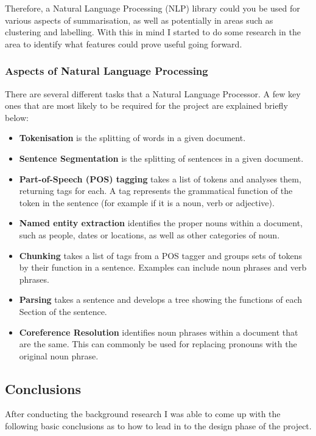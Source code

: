 \documentclass[12pt]{article}
\begin{document}
Therefore, a Natural Language Processing (NLP) library could you be used for various aspects of summarisation, as well as potentially in areas such as clustering and labelling. With this in mind I started to do some research in the area to identify what features could prove useful going forward.

\subsubsection{Aspects of Natural Language Processing} 

\label{nlptypes}

There are several different tasks that a Natural Language Processor. A few key ones that are most likely to be required for the project are explained briefly below: 

\begin{itemize}
	\item \textbf{Tokenisation} is the splitting of words in a given document. 
	\item \textbf{Sentence Segmentation} is the splitting of sentences in a given document. 
	\item \textbf{Part-of-Speech (POS) tagging} takes a list of tokens and analyses them, returning tags for each. A tag represents the grammatical function of the token in the sentence (for example if it is a noun, verb or adjective). 
	\item \textbf{Named entity extraction} identifies the proper nouns within a document, such as people, dates or locations, as well as other categories of noun. 
	\item \textbf{Chunking} takes a list of tags from a POS tagger and groups sets of tokens by their function in a sentence. Examples can include noun phrases and verb phrases. 
	\item \textbf{Parsing} takes a sentence and develops a tree showing the functions of each Section of the sentence. 
	\item \textbf{Coreference Resolution} identifies noun phrases within a document that are the same. This can commonly be used for replacing pronouns with the original noun phrase. 
\end{itemize}

\subsection{Conclusions}

After conducting the background research I was able to come up with the following basic conclusions as to how to lead in to the design phase of the project.
\end{document}
